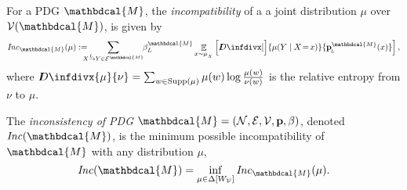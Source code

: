 \documentclass[letterpaper]{article} %
\theoremstyle{plain}
\theoremstyle{definition}
\theoremstyle{remark}
\newcommand{\thickD}{I\mkern-8muD}
\newcommand{\kldiv}{\thickD\infdivx}
\DeclareMathOperator*{\E}{\mathbb{E}} %
\newcommand\mat[1]{\mathbf{#1}}
\def\sheq{\!=\!}
\newcommand{\bp}[1][L]{\mat{p}_{\!_{#1}\!}}
\newcommand{\V}{\mathcal V}
\newcommand{\N}{\mathcal N}
\newcommand{\Ed}{\mathcal E}
\newcommand{\pdgvars}[1][]{(\N#1, \Ed#1, \V#1, \mat p#1, \beta#1)}
\newcommand{\dg}[1]{\mathbdcal{#1}}
\newcommand\Inc{\mathit{Inc}}
\newcommand{\ed}[3]{#2
  \overset{\smash{\mskip-5mu\raisebox{-1pt}{$\scriptscriptstyle
        #1$}}}{\rightarrow} #3}
\begin{document}
\begin{defn}\label{def:inc}
    For a PDG $\dg M$, the \emph{incompatibility} of a
    a joint distribution $\mu$ over $\V(\dg M)$, is given by
    \[
	\Inc_{\dg M }( \mu) := 
		\!\!\!\!\!\sum_{\ed LXY \in \Ed^{\dg M}} \!\!\beta_L^{\dg M} \E_{x \sim \mu_{_X}}
\left[\kldiv[\Big]{ \mu(Y \mid X \sheq x) }{\bp^{\dg M}(x) } \right] ,
	\]
	where $\kldiv{\mu}{\nu} = \sum_{w \in \text{Supp($\mu$)}} \mu(w) \log\frac{\mu(w)}{\nu(w)}$ is the 
	relative entropy from $\nu$ to $\mu$.
\begin{vfull}
The \emph{inconsistency of PDG $\dg M = \pdgvars[]$}, 
       denoted $\Inc(\dg M)$, is the
minimum possible incompatibility of $\dg M$ with any
distribution $\mu$,  
	\[ \Inc(\dg M) = \inf_{ \mu \in \Delta [W_{\cal V}]} \Inc_{\dg M}(\mu) . \]
\end{vfull}
\end{defn}
\end{document}
